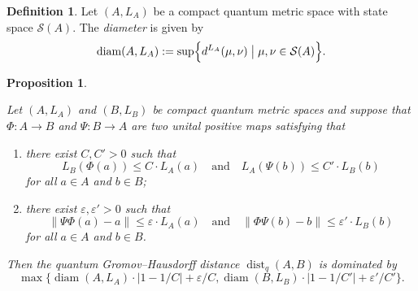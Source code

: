 \documentclass[12pt, reqno]{amsart}
\newtheorem{proposition}[theorem]{Proposition}
\theoremstyle{definition}
\newtheorem{definition}[theorem]{Definition}
\theoremstyle{remark}
\numberwithin{equation}{section}
\begin{document}
\begin{definition}
    Let $(A, L_A)$ be a compact quantum metric space with state space $\mathcal{S}(A)$. The \emph{diameter} is given by
    \[
        \operatorname{diam}(A, L_A) 
        := \sup \Bigl\{ d^{L_A}(\mu, \nu) \;\big|\; \mu, \nu \in \mathcal{S}(A) \Bigr\}.
    \]
\end{definition}
\begin{proposition}\label{prop:gromov hausdorff converges}
 
Let $(A, L_A)$ and $(B, L_B)$ be compact quantum metric spaces and suppose that $\Phi: A \to B$ and $\Psi: B \to A$ are two unital positive maps satisfying that
\begin{enumerate}
    \item[(1)] there exist $C, C' > 0$ such that
    \[
    L_B(\Phi(a)) \leqslant C \cdot L_A(a) \quad \text{and} \quad L_A(\Psi(b)) \leqslant C' \cdot L_B(b)
    \]
    for all $a \in A$ and $b \in B$;
    \item[(2)] there exist $\varepsilon, \varepsilon' > 0$ such that
    \[
    \|\Psi\Phi(a) - a\| \leqslant \varepsilon \cdot L_A(a) \quad \text{and} \quad \|\Phi\Psi(b) - b\| \leqslant \varepsilon' \cdot L_B(b)
    \]
    for all $a \in A$ and $b \in B$.
\end{enumerate}
Then the quantum Gromov--Hausdorff distance $\operatorname{dist}_{q}(A,B)$ is dominated by
\[
\max\bigl\{ \operatorname{diam}(A, L_A) \cdot |1 - 1/C| + \varepsilon/C, \operatorname{diam}(B, L_B) \cdot |1 - 1/C'| + \varepsilon'/C' \bigr\}.
\]
\end{proposition}
\end{document}
